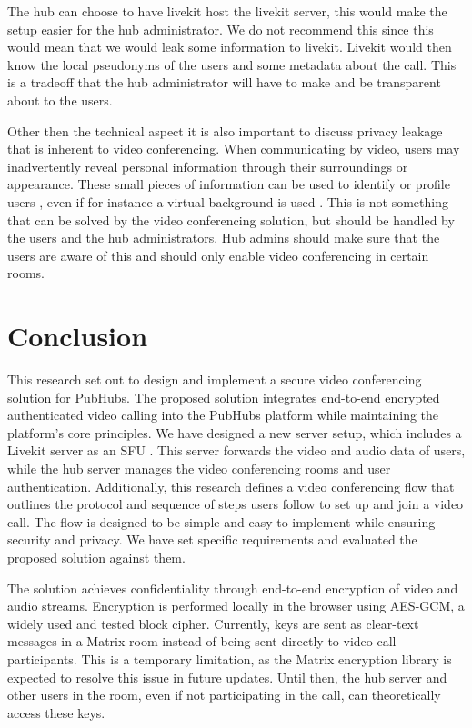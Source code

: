 \documentclass{report}
\begin{document}
The hub can choose to have livekit host the livekit server, this would make the setup easier for the hub administrator.
We do not recommend this since this would mean that we would leak some information to livekit. Livekit would then know
the local pseudonyms of the users and some metadata about the call. This is a tradeoff that the hub administrator will
have to make and be transparent about to the users.

Other then the technical aspect it is also important to discuss privacy leakage that is inherent to video conferencing.
When communicating by video, users may inadvertently reveal personal information through their surroundings or
appearance. These small pieces of information can be used to identify or profile users \cite{kagan_zooming_2024},
even if for instance a virtual background is used \cite{hilgefort_spying_2021}. This is not something that can be solved by the video conferencing solution, but
should be handled by the users and the hub administrators. Hub admins should make sure that the users are aware of
this and should only enable video conferencing in certain rooms.

\chapter{Conclusion}
This research set out to design and implement a secure video conferencing solution for PubHubs. The proposed
solution integrates end-to-end encrypted authenticated video calling into the PubHubs platform while maintaining
the platform's core principles. We have designed a new server setup, which includes a Livekit server as an SFU .
This server forwards the video and audio data of users, while the hub server manages the video conferencing rooms
and user authentication. Additionally, this research defines a video conferencing flow that outlines the protocol
and sequence of steps users follow to set up and join a video call. The flow is designed to be simple and easy to
implement while ensuring security and privacy. We have set specific requirements and evaluated the proposed
solution against them.

The solution achieves confidentiality through end-to-end encryption of video and audio streams. Encryption is
performed locally in the browser using AES-GCM, a widely used and tested block cipher. Currently, keys are sent as
clear-text messages in a Matrix room instead of being sent directly to video call participants. This is a temporary
limitation, as the Matrix encryption library is expected to resolve this issue in future updates. Until then, the
hub server and other users in the room, even if not participating in the call, can theoretically access these keys.
\end{document}
